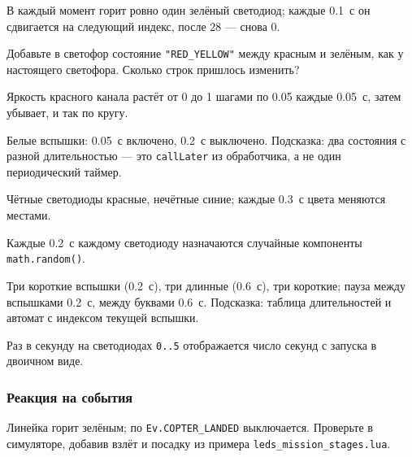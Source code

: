 \begin{taskbox}
В каждый момент горит ровно один зелёный светодиод; каждые 0.1~с он сдвигается на следующий индекс, после 28 --- снова 0.
\end{taskbox}

\begin{taskbox}
Добавьте в светофор состояние \verb|"RED_YELLOW"| между красным и зелёным, как у настоящего светофора. Сколько строк пришлось изменить?
\end{taskbox}

\begin{taskbox}
Яркость красного канала растёт от 0 до 1 шагами по 0.05 каждые 0.05~с, затем убывает, и так по кругу.
\end{taskbox}

\begin{taskbox}[Стробоскоп]
Белые вспышки: 0.05~с включено, 0.2~с выключено. Подсказка: два состояния с разной длительностью --- это \verb|callLater| из обработчика, а не один периодический таймер.
\end{taskbox}

\begin{taskbox}
Чётные светодиоды красные, нечётные синие; каждые 0.3~с цвета меняются местами.
\end{taskbox}

\begin{taskbox}
Каждые 0.2~с каждому светодиоду назначаются случайные компоненты \verb|math.random()|.
\end{taskbox}

\begin{taskbox}
Три короткие вспышки (0.2~с), три длинные (0.6~с), три короткие; пауза между вспышками 0.2~с, между буквами 0.6~с. Подсказка: таблица длительностей и автомат с индексом текущей вспышки.
\end{taskbox}

\begin{taskbox}
Раз в секунду на светодиодах \verb|0..5| отображается число секунд с запуска в двоичном виде.
\end{taskbox}

\subsubsection*{Реакция на события}

\begin{taskbox}
Линейка горит зелёным; по \verb|Ev.COPTER_LANDED| выключается. Проверьте в симуляторе, добавив взлёт и посадку из примера \texttt{leds\_mission\_stages.lua}.
\end{taskbox}

